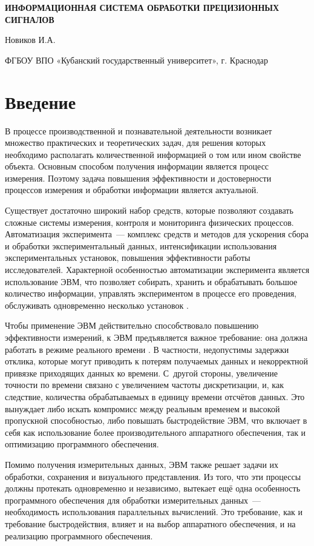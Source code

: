 \documentclass[a4paper, 14pt]{extarticle}
\author{\theauthor, \theinstitute}
\title{\thetitle}
\newcommand\sectiontoc[1]{\section*{#1}\addcontentsline{toc}{section}{#1}}
\newcommand{\thetitle}{ИНФОРМАЦИОННАЯ СИСТЕМА ОБРАБОТКИ ПРЕЦИЗИОННЫХ СИГНАЛОВ}
\newcommand{\theauthor}{Новиков И.А.}
\newcommand{\theinstitute}{ФГБОУ ВПО «Кубанский государственный университет»}
\begin{document}
  \begin{center}
    \textbf{\thetitle}

    \theauthor

    \theinstitute, г. Краснодар
  \end{center}

  \sectiontoc{Введение}\label{sec:intro}

  В процессе производственной и познавательной деятельности возникает множество практических и
  теоретических задач, для решения которых необходимо располагать количественной информацией о том
  или ином свойстве объекта. Основным способом получения информации является процесс измерения.
  Поэтому задача повышения эффективности и достоверности процессов измерения и обработки информации
  является актуальной.

  Существует достаточно широкий набор средств, которые позволяют создавать сложные системы
  измерения, контроля и мониторинга физических процессов. Автоматизация эксперимента~--- комплекс
  средств и методов для ускорения сбора и обработки экспериментальный данных, интенсификации
  использования экспериментальных установок, повышения эффективности работы исследователей.
  Характерной особенностью автоматизации эксперимента является использование ЭВМ, что позволяет
  собирать, хранить и обрабатывать большое количество информации, управлять экспериментом в процессе
  его проведения, обслуживать одновременно несколько установок \cite{sokolov-auto-measure}.

  Чтобы применение ЭВМ действительно способствовало повышению эффективности измерений, к ЭВМ
  предъявляется важное требование: она должна работать в режиме реального времени
  \cite{tessier-reconfigurable}. В частности, недопустимы задержки отклика, которые могут приводить
  к потерям получаемых данных и некорректной привязке приходящих данных ко времени. С~другой
  стороны, увеличение точности по времени связано с увеличением частоты дискретизации, и, как
  следствие, количества обрабатываемых в единицу времени отсчётов данных. Это вынуждает либо искать
  компромисс между реальным временем и высокой пропускной способностью, либо повышать быстродействие
  ЭВМ, что включает в себя как использование более производительного аппаратного обеспечения, так и
  оптимизацию программного обеспечения.

  Помимо получения измерительных данных, ЭВМ также решает задачи их обработки, сохранения и
  визуального представления. Из того, что эти процессы должны протекать одновременно и независимо,
  вытекает ещё одна особенность программного обеспечения для обработки измерительных данных~---
  необходимость использования параллельных вычислений. Это требование, как и требование
  быстродействия, влияет и на выбор аппаратного обеспечения, и на реализацию программного обеспечения.
\end{document}
